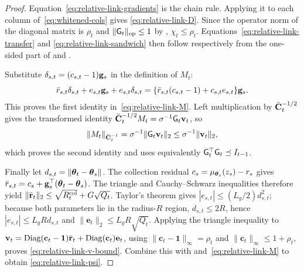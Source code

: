 \begin{proof}
Equation~\eqref{eq:relative-link-gradients} is the chain rule.  Applying it to
each column of~\eqref{eq:whitened-cols} gives
\eqref{eq:relative-link-D}.  Since the operator norm of the diagonal matrix is
$\rho_t$ and $\|\mathsf{G}_t\|_{\rm op}\le1$ by ,
$\chi_t\le\rho_t$.  Equations~\eqref{eq:relative-link-transfer} and
\eqref{eq:relative-link-sandwich} then follow respectively from the one-sided
part of  and .

Substitute $\delta_{s,t}=(c_{s,t}-1)\mathbf{g}_s$ in the definition of $M_t$:
\[
 \bar r_{s,t}\delta_{s,t}+e_{s,t}\mathbf{g}_s+e_{s,t}\delta_{s,t}
 =\{\bar r_{s,t}(c_{s,t}-1)+c_{s,t}e_{s,t}\}\mathbf{g}_s.
\]
This proves the first identity in~\eqref{eq:relative-link-M}.  Left
multiplication by $\bar{\mathbf{C}}_t^{-1/2}$ gives the transformed identity
$\bar{\mathbf{C}}_t^{-1/2}M_t=\sigma^{-1}\mathsf{G}_t\mathbf{v}_t$, so
\[
 \|M_t\|_{\bar{\mathbf{C}}_t^{-1}}
 =\sigma^{-1}\|\mathsf{G}_t\mathbf{v}_t\|_2
 \le\sigma^{-1}\|\mathbf{v}_t\|_2,
\]
which proves the second identity and uses equivalently
$\mathsf{G}_t^\top\mathsf{G}_t\preceq I_{t-1}$.

Finally let $d_{s,t}=\|\boldsymbol{\theta}_t-\boldsymbol{\theta}_s\|$.  The collection residual
$c_s=\mu_{\boldsymbol{\theta}_s}(z_s)-r_s$ gives
$\bar r_{s,t}=c_s+\mathbf{g}_s^\top(\boldsymbol{\theta}_t-\boldsymbol{\theta}_s)$.  The triangle and
Cauchy--Schwarz inequalities therefore yield
$\|\bar{\mathbf r}_t\|_2\le\sqrt{R_t^{\rm col}}+G\sqrt{Q_t}$.
Taylor's theorem gives $|e_{s,t}|\le(L_g/2)d_{s,t}^2$; because both parameters
lie in the radius-$R$ region, $d_{s,t}\le2R$, hence
$|e_{s,t}|\le L_gR d_{s,t}$ and
$\|\mathbf e_t\|_2\le L_gR\sqrt{Q_t}$.  Applying the triangle inequality to
$\mathbf{v}_t=\operatorname{Diag}(\mathbf c_t-\mathbf{1})\bar{\mathbf r}_t
+\operatorname{Diag}(\mathbf c_t)\mathbf e_t$, using
$\|\mathbf c_t-\mathbf{1}\|_\infty=\rho_t$ and
$\|\mathbf c_t\|_\infty\le1+\rho_t$, proves
\eqref{eq:relative-link-v-bound}.  Combine this with
 and~\eqref{eq:relative-link-M} to obtain
\eqref{eq:relative-link-psi}.
\end{proof}

